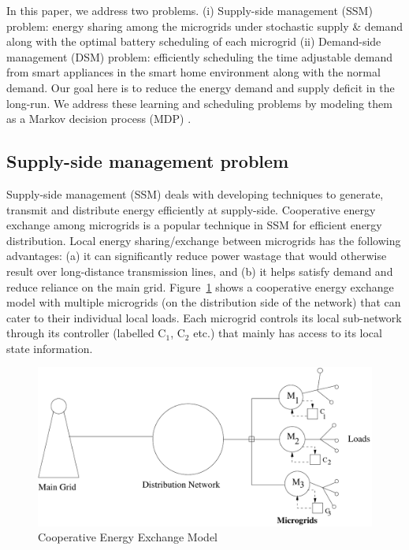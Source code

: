 In this paper, we address two  problems. (i) Supply-side management (SSM) problem: energy sharing among the microgrids under stochastic supply \& demand along with the optimal battery scheduling of each microgrid (ii) Demand-side management (DSM) problem: efficiently scheduling the time adjustable demand from smart appliances in the smart home environment along with the normal demand. Our goal here is to reduce the energy demand and supply deficit in the long-run. We address these learning and scheduling problems by modeling them as a Markov decision process (MDP) \cite{puterman2014markov}. 

\subsection{Supply-side management problem} \label{subsec:ssm}
 Supply-side management (SSM)\cite{} deals with developing techniques to  generate, transmit and distribute energy efficiently at supply-side. Cooperative energy exchange among microgrids is a popular technique in SSM for efficient energy distribution.  Local energy sharing/exchange between microgrids has the
following advantages:
(a) it can significantly reduce power wastage that would
otherwise result over long-distance transmission lines, and (b) it
helps satisfy demand and reduce reliance on the main grid. 
 Figure~\ref{gridmodel} shows a cooperative energy exchange model with multiple microgrids
(on the distribution side of the network) that can cater to their individual
local loads. Each microgrid controls its local sub-network through its controller (labelled
$\mbox{C}_1$, $\mbox{C}_2$ etc.) that mainly has access to its local state information.


\begin{figure}[thpb]
      \centering
      \includegraphics[scale=0.4]{powergrid2.pdf}
      \caption{Cooperative Energy Exchange Model}
      \label{gridmodel}
\end{figure}

